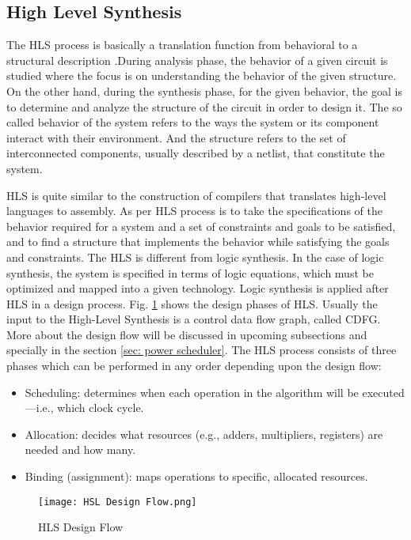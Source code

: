 \documentclass[conference]{IEEEtran}
\begin{document}
\subsection{High Level Synthesis}
\label{subsec: HLS}
The HLS process is basically a translation function from behavioral to a structural description \cite{DDG92}.During analysis phase, the behavior of a given circuit is studied where the focus is on understanding the behavior of the given structure. On the other hand, during the synthesis phase, for the given behavior, the goal is to determine and analyze the structure of the circuit in order to design it. The so called behavior of the system refers to the ways the system or its component interact with their environment. And the structure refers to the set of interconnected components, usually described by a netlist, that constitute the system. 

HLS is quite similar to the construction of compilers that translates high-level languages to assembly. As per \cite{52214} HLS process is to take the specifications of the behavior required for a system and a set of constraints and goals to be satisfied, and to find a structure that implements the behavior while satisfying the goals and constraints. The HLS is different from logic synthesis. In the case of logic synthesis, the system is specified in terms of logic equations, which must be optimized and mapped into a given technology. Logic synthesis is applied after HLS in a design process.
Fig. \ref{fig:HLS Design Flow} shows the design phases of HLS. Usually the input to the High-Level Synthesis is a control data flow graph, called CDFG. More about the design flow will be discussed in upcoming subsections and specially in the section \ref{sec: power scheduler}. The HLS process consists of three phases which can be performed in any order depending upon the design flow: 
\begin{itemize}
    \item Scheduling: determines when each operation in the algorithm will be executed—i.e., which clock cycle.
    \item Allocation: decides what resources (e.g., adders, multipliers, registers) are needed and how many.
    \item Binding (assignment): maps operations to specific, allocated resources.
\end{itemize}

\begin{figure}[h!]
    \centering
    \texttt{[image: HSL Design Flow.png]}
    \caption{HLS Design Flow \cite{Ret}}
    \label{fig:HLS Design Flow}
\end{figure}
\end{document}
